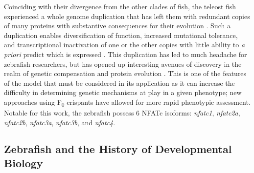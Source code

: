 Coinciding with their divergence from the other clades of fish, the teleost fish experienced a whole genome duplication that has left them with redundant copies of many proteins with substantive consequences for their evolution \citep{Meyer1999, Amores2011, Howe2013, Glasauer2014}. Such a duplication enables diversification of function, increased mutational tolerance, and transcriptional inactivation of one or the other copies with little ability to \textit{a priori} predict which is expressed \citep{Opazo2013, Voldoire2017}. This duplication has led to much headache for zebrafish researchers, but has opened up interesting avenues of discovery in the realm of genetic compensation and protein evolution \citep{Moleri2011, Boudinot2011, Rossi2015, Stainier2015, ElBrolosy2017, Stainier2017, ElBrolosy2019, Sztal2020, Kontarakis2020}. This is one of the features of the model that must be considered in its application as it can increase the difficulty in determining genetic mechanisms at play in a given phenotype; new approaches using F\textsubscript{0} crispants have allowed for more rapid phenotypic assessment. Notable for this work, the zebrafish possess 6 NFATc isoforms: \textit{nfatc1}, \textit{nfatc2a}, \textit{nfatc2b}, \textit{nfatc3a}, \textit{nfatc3b}, and \textit{nfatc4}.

\subsection{Zebrafish and the History of Developmental Biology}\label{zfhist}

